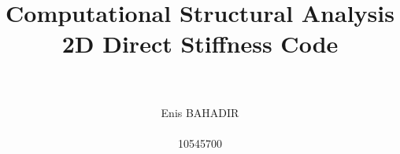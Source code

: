 \documentclass[12pt,a4paper,titlepage]{article}
\begin{document}
%
%
\title{Computational Structural Analysis \\ 2D Direct Stiffness Code}
\author{\\\\Enis BAHADIR \\\\ 10545700}
\maketitle
%
%
\setcounter{page}{1}
%
%
%

%
\end{document}
